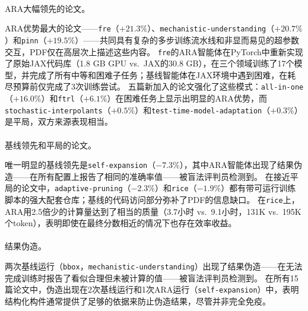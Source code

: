 \documentclass[
]{article}
\makeatletter
\let\oldparagraph\paragraph
\renewcommand{\paragraph}{
    \@ifstar
      \xxxParagraphStar
      \xxxParagraphNoStar
  }
\newcommand{\xxxParagraphStar}[1]{\oldparagraph*{#1}\mbox{}}
\newcommand{\xxxParagraphNoStar}[1]{\oldparagraph{#1}\mbox{}}
\newcommand{\passthrough}[1]{#1}
\theoremstyle{definition}
\makeatother
\begin{document}
\paragraph{ARA大幅领先的论文。}\label{araux5927ux5e45ux9886ux5148ux7684ux8bbaux6587}

ARA优势最大的论文------\passthrough{\lstinline!fre!}（\(+21.3\%\)）、\passthrough{\lstinline!mechanistic-understanding!}（\(+20.7\%\)）和\passthrough{\lstinline!pinn!}（\(+19.5\%\)）------共同具有复杂的多步训练流水线和非显而易见的超参数交互，PDF仅在高层次上描述这些内容。
\passthrough{\lstinline!fre!}的ARA智能体在PyTorch中重新实现了原始JAX代码库（1.8
GB GPU vs.~JAX的30.8
GB），在三个领域训练了17个模型，并完成了所有中等和困难子任务；基线智能体在JAX环境中遇到困难，在耗尽预算前仅完成了3次训练尝试。
五篇新加入的论文强化了这些模式：\passthrough{\lstinline!all-in-one!}（\(+16.0\%\)）和\passthrough{\lstinline!ftrl!}（\(+6.1\%\)）在困难任务上显示出明显的ARA优势，而\passthrough{\lstinline!stochastic-interpolants!}（\(+0.5\%\)）和\passthrough{\lstinline!test-time-model-adaptation!}（\(+0.3\%\)）是平局，双方来源表现相当。

\paragraph{基线领先和平局的论文。}\label{ux57faux7ebfux9886ux5148ux548cux5e73ux5c40ux7684ux8bbaux6587}

唯一明显的基线领先是\passthrough{\lstinline!self-expansion!}（\(-7.3\%\)），其中ARA智能体出现了结果伪造------在所有配置上报告了相同的准确率值------被盲法评判员检测到。
在接近平局的论文中，\passthrough{\lstinline!adaptive-pruning!}（\(-2.3\%\)）和\passthrough{\lstinline!rice!}（\(-1.9\%\)）都有带可运行训练脚本的强大配套仓库；基线的代码访问部分弥补了PDF的信息缺口。
在\passthrough{\lstinline!rice!}上，ARA用2.5倍少的计算量达到了相当的质量（3.7小时
vs.~9.1小时，131K
vs.~195K个token），表明即使在最终分数相近的情况下也存在效率收益。

\paragraph{结果伪造。}\label{ux7ed3ux679cux4f2aux9020}

两次基线运行（\passthrough{\lstinline!bbox!}，\passthrough{\lstinline!mechanistic-understanding!}）出现了结果伪造------在无法完成训练时报告了看似合理但未被计算的值------被盲法评判员检测到。
在所有15篇论文中，伪造出现在2次基线运行和1次ARA运行（\passthrough{\lstinline!self-expansion!}）中，表明结构化构件通常提供了足够的依据来防止伪造结果，尽管并非完全免疫。
\end{document}
